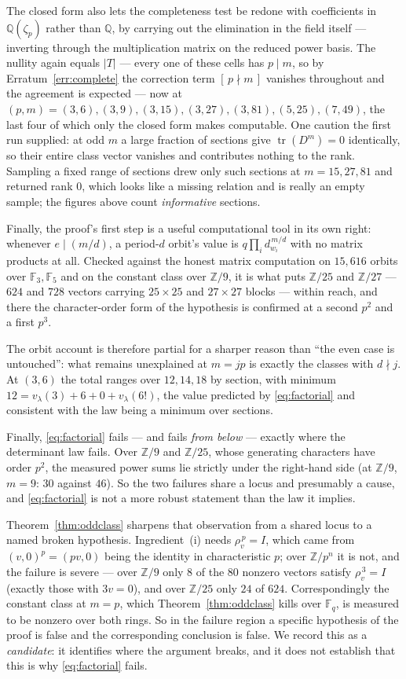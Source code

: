 \documentclass[11pt]{article}
\theoremstyle{plain}
\theoremstyle{definition}
\newcommand{\FF}{\mathbb F}
\newcommand{\ZZ}{\mathbb Z}
\newcommand{\QQ}{\mathbb Q}
\newcommand{\tr}{\operatorname{tr}}
\newcommand{\vlam}{v_\lambda}
\begin{document}
The closed form also lets the completeness test be redone with coefficients in
$\QQ(\zeta_p)$ rather than $\QQ$, by carrying out the elimination in the field
itself --- inverting through the multiplication matrix on the reduced power
basis. The nullity again equals $\lvert T\rvert$ --- every one of these cells has
$p\mid m$, so by Erratum~\ref{err:complete} the correction term
$[\,p\nmid m\,]$ vanishes throughout and the agreement is expected --- now at
$(p,m)=(3,6),(3,9),(3,15),(3,27),(3,81),(5,25),(7,49)$, the last four of which
only the closed form makes computable. One caution the first run supplied: at
odd $m$ a large fraction of sections give $\tr(D^m)=0$ identically, so their
entire class vector vanishes and contributes nothing to the rank. Sampling a
fixed range of sections drew only such sections at $m=15,27,81$ and returned
rank $0$, which looks like a missing relation and is really an empty sample;
the figures above count \emph{informative} sections.

Finally, the proof's first step is a useful computational tool in its own
right: whenever $e\mid(m/d)$, a period-$d$ orbit's value is
$q\prod_i d_{w_i}^{\,m/d}$ with no matrix products at all. Checked against the
honest matrix computation on $15{,}616$ orbits over $\FF_3,\FF_5$ and on the
constant class over $\ZZ/9$, it is what puts $\ZZ/25$ and $\ZZ/27$ --- $624$
and $728$ vectors carrying $25\times25$ and $27\times27$ blocks --- within
reach, and there the character-order form of the hypothesis is confirmed at a
second $p^2$ and a first $p^3$.

The orbit account is therefore partial for a sharper reason than ``the even
case is untouched'': what remains unexplained at $m=jp$ is exactly the classes
with $d\nmid j$. At $(3,6)$ the total ranges over $12,14,18$ by section, with
minimum $12=\vlam(3)+6+0+\vlam(6!)$, the value predicted by
\eqref{eq:factorial} and consistent with the law being a minimum over sections.

Finally, \eqref{eq:factorial} fails --- and fails \emph{from below} --- exactly
where the determinant law fails. Over $\ZZ/9$ and $\ZZ/25$, whose generating
characters have order $p^2$, the measured power sums lie strictly under the
right-hand side (at $\ZZ/9$, $m=9$: $30$ against $46$). So the two failures
share a locus and presumably a cause, and \eqref{eq:factorial} is not a more
robust statement than the law it implies.

Theorem~\ref{thm:oddclass} sharpens that observation from a shared locus to a
named broken hypothesis. Ingredient~(i) needs $\rho_v^{\,p}=I$, which came from
$(v,0)^p=(pv,0)$ being the identity in characteristic $p$; over $\ZZ/p^{n}$ it
is not, and the failure is severe --- over $\ZZ/9$ only $8$ of the $80$
nonzero vectors satisfy $\rho_v^{\,3}=I$ (exactly those with $3v=0$), and over
$\ZZ/25$ only $24$ of $624$. Correspondingly the constant class at $m=p$, which
Theorem~\ref{thm:oddclass} kills over $\FF_q$, is measured to be nonzero over
both rings. So in the failure region a specific hypothesis of the proof is
false and the corresponding conclusion is false. We record this as a
\emph{candidate}: it identifies where the argument breaks, and it does not
establish that this is why \eqref{eq:factorial} fails.
\end{document}
